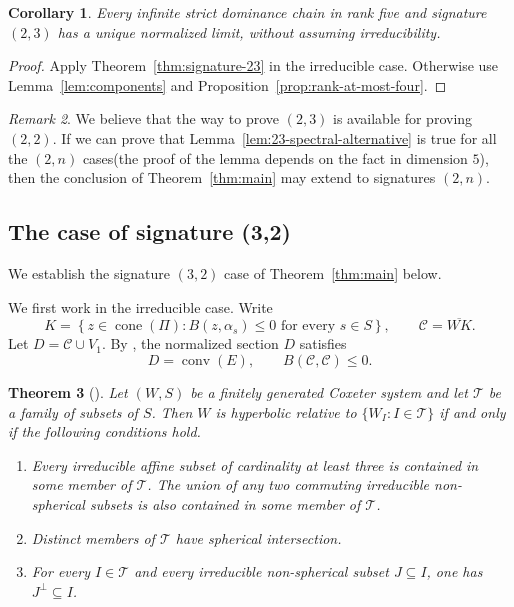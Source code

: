 \documentclass[11pt,reqno]{amsart}
\theoremstyle{plain}
\newtheorem{theorem}{Theorem}[section]
\newtheorem{corollary}[theorem]{Corollary}
\theoremstyle{definition}
\theoremstyle{remark}
\newtheorem{remark}[theorem]{Remark}
\numberwithin{equation}{section}
\begin{document}
\begin{corollary}\label{cor:rank5-23-chain}
Every infinite strict dominance chain in rank five and signature $(2,3)$ has a unique normalized limit, without assuming irreducibility.
\end{corollary}
\begin{proof}
Apply Theorem~\ref{thm:signature-23} in the irreducible case. Otherwise use Lemma~\ref{lem:components} and Proposition~\ref{prop:rank-at-most-four}.
\end{proof}
\begin{remark}
    We believe that the way to prove $(2,3)$ is available for proving $(2,2)$. If we can prove that Lemma~\ref{lem:23-spectral-alternative} is true for all the $(2,n)$ cases(the proof of the lemma depends on the fact in dimension $5$), then the conclusion of Theorem~\ref{thm:main} may extend to signatures $(2,n)$.
\end{remark}
\subsection{The case of signature (3,2)}\label{sec:signature-32}

We establish the signature $(3,2)$ case of Theorem~\ref{thm:main} below.

We first work in the irreducible case. Write
\[
    K=
    \left\{
        z\in\operatorname{cone}(\Pi):
        B(z,\alpha_s)\leq0\text{ for every }s\in S
    \right\},
    \qquad
    \mathcal C=\overline{WK}.
\]
Let $D=\mathcal C\cup V_1$. By \cite[Theorem~2.2]{DHR}, the normalized section $D$ satisfies
\[
    D=\operatorname{conv}(E),
    \qquad
    B(\mathcal C,\mathcal C)\leq0.
\]
\begin{theorem}[{\cite[Theorem~A$'$]{CapraceErratum}}]\label{thm:caprace-relative}
Let $(W,S)$ be a finitely generated Coxeter system and let $\mathcal T$ be a family of subsets of $S$.
Then $W$ is hyperbolic relative to $\{W_I:I\in\mathcal T\}$ if and only if the following conditions hold.
\begin{enumerate}[label=\textup{(RH\arabic*)}]
    \item Every irreducible affine subset of cardinality at least three is contained in some member of $\mathcal T$. The union of any two commuting irreducible non-spherical subsets is also contained in some member of $\mathcal T$.
    \item Distinct members of $\mathcal T$ have spherical intersection.
    \item For every $I\in\mathcal T$ and every irreducible non-spherical subset $J\subseteq I$, one has $J^\perp\subseteq I$.
\end{enumerate}
\end{theorem}
\end{document}
